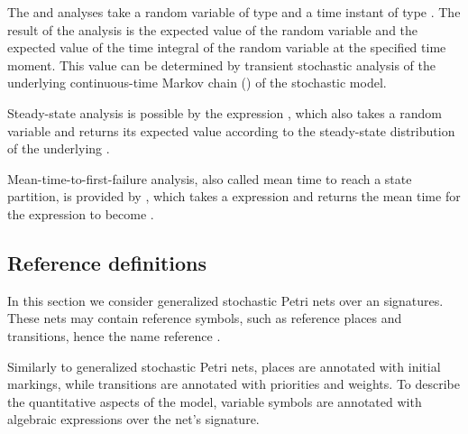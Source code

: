 The  and  analyses take a random variable of type  and a time instant of type . The result of the analysis is the expected value of the random variable and the expected value of the time integral of the random variable at the specified time moment. This value can be determined by transient stochastic analysis of the underlying continuous-time Markov chain () of the stochastic model.

Steady-state analysis is possible by the expression , which also takes a  random variable and returns its expected value according to the steady-state distribution of the underlying .

Mean-time-to-first-failure analysis, also called mean time to reach a state partition, is provided by , which takes a  expression and returns the mean time for the expression to become .

\subsection{Reference  definitions}

In this section we consider generalized stochastic Petri nets over an  signatures. These nets may contain reference symbols, such as reference places and transitions, hence the name reference .

Similarly to generalized stochastic Petri nets, places are annotated with initial markings, while transitions are annotated with priorities and weights. To describe the quantitative aspects of the model, variable symbols are annotated with algebraic expressions over the net's signature.


